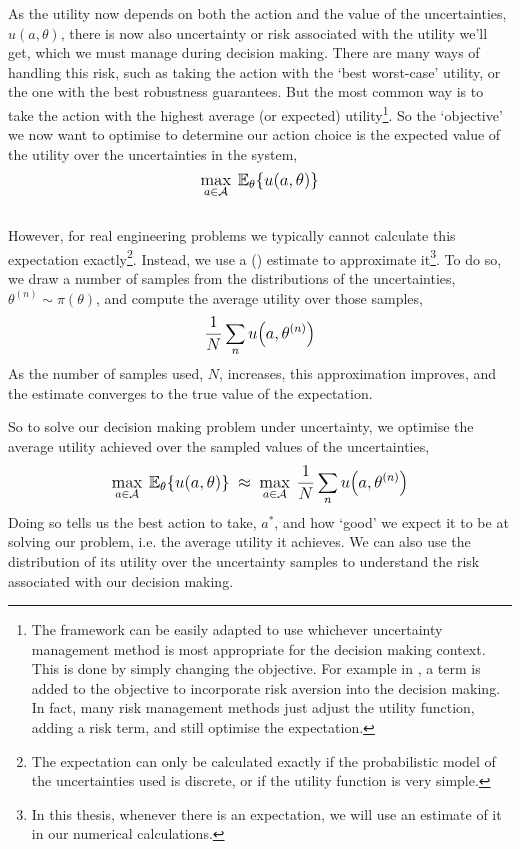 As the utility now depends on both the action and the value of the uncertainties, $u(a,\theta)$, there is now also uncertainty or risk associated with the utility we'll get, which we must manage during decision making. There are many ways of handling this risk, such as taking the action with the `best worst-case' utility, or the one with the best robustness guarantees. But the most common way is to take the action with the highest average (or expected) utility\footnote{The framework can be easily adapted to use whichever uncertainty management method is most appropriate for the decision making context. This is done by simply changing the objective. For example in , a  term is added to the objective to incorporate risk aversion into the decision making. In fact, many risk management methods just adjust the utility function, adding a risk term, and still optimise the expectation.}. So the `objective' we now want to optimise to determine our action choice is the expected value of the utility over the uncertainties in the system,
\begin{equation} \label{eq:methodology-prior-optimisation}
    \mathlarger{\max_{a \in \mathcal{A}} \: \mathbb{E}_{\theta}\lbrace u(a,\theta) \rbrace}
\end{equation}\\

\noindent
However, for real engineering problems we typically cannot calculate this expectation exactly\footnote{The expectation can only be calculated exactly if the probabilistic model of the uncertainties used is discrete, or if the utility function is very simple.}. Instead, we use a  () estimate to approximate it\footnote{In this thesis, whenever there is an expectation, we will use an  estimate of it in our numerical calculations.}. To do so, we draw a number of samples from the distributions of the uncertainties, $\theta^{(n)} \sim \pi(\theta)$, and compute the average utility over those samples,
\begin{equation}
    \mathlarger{\frac{1}{N} \sum_n u\big(a,\theta^{(n)}\big)}
\end{equation}
As the number of samples used, $N$, increases, this approximation improves, and the estimate converges to the true value of the expectation.

So to solve our decision making problem under uncertainty, we optimise the average utility achieved over the sampled values of the uncertainties,
\begin{equation}
    \mathlarger{\max_{a \in \mathcal{A}} \: \mathbb{E}_{\theta}\lbrace u(a,\theta) \rbrace \: \approx \: \max_{a \in \mathcal{A}} \: \frac{1}{N} \sum_n u\big(a,\theta^{(n)}\big)}
\end{equation}
Doing so tells us the best action to take, $a^*$, and how `good' we expect it to be at solving our problem, i.e. the average utility it achieves. We can also use the distribution of its utility over the uncertainty samples to understand the risk associated with our decision making.\\

